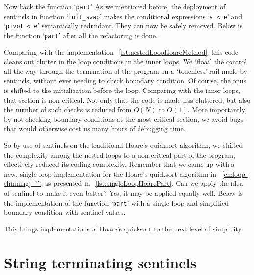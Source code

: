 \documentclass[oneside,11pt]{book}
\theoremstyle{definition}
\theoremstyle{remark}
\newcommand{\code}[1]{\mbox{\lstinline{#1}}}
\newcommand*{\fullref}[1]{\hyperref[{#1}]{\mbox{\autoref*{#1}~}``\nameref*{#1}''}}
\begin{document}
Now back the function `\code{part}'.
As we mentioned before, the deployment of sentinels in function `\code{init_swap}' makes
the conditional expressions `\code{s < e}' and `\code{pivot < e}' semantically redundant.
They can now be safely removed.
Below is the function `\code{part}' after all the refactoring is done.

Comparing with the implementation ~\autoref{lst:nestedLoopHoareMethod}, this code
cleans out clutter in the loop conditions in the inner loops.
We `float' the control all the way through the termination of the program on a `touchless' rail made
by sentinels, without ever needing to check boundary condition.
Of course, the onus is shifted to the initialization before the loop.
Comparing with the inner loops, that section is non-critical.
Not only that the code is made less cluttered, but also the number of such checks
is reduced from $O(N)$ to $O(1)$.
More importantly, by not checking boundary conditions at the most critical section,
we avoid bugs that would otherwise cost us many hours of debugging time.


So by use of sentinels on the traditional Hoare's quicksort algorithm,
we shifted the complexity among the nested loops to a non-critical part of the program,
effectively reduced its coding complexity.
Remember that we came up with a new, single-loop implementation for the Hoare's quicksort algorithm
in ~\fullref{ch:loop-thinning}, as presented in ~\autoref{lst:singleLoopHoarePart}.
Can we apply the idea of sentinel to make it even better?
Yes, it may be applied equally well.
Below is the implementation of the function `\code{part}' with a single loop and simplified
boundary condition with sentinel values.

This brings implementations of Hoare's quicksort to the next level of simplicity.


\section{String terminating sentinels}\label{sec:stringTerminationSentinels}
\end{document}

